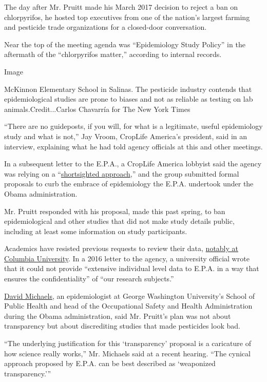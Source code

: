 The day after Mr. Pruitt made his March 2017 decision to reject a ban on
chlorpyrifos, he hosted top executives from one of the nation's largest
farming and pesticide trade organizations for a closed-door
conversation.

Near the top of the meeting agenda was ``Epidemiology Study Policy'' in
the aftermath of the ``chlorpyrifos matter,'' according to internal
records.

Image

McKinnon Elementary School in Salinas. The pesticide industry contends
that epidemiological studies are prone to biases and not as reliable as
testing on lab animals.Credit...Carlos Chavarría for The New York Times

``There are no guideposts, if you will, for what is a legitimate, useful
epidemiology study and what is not,'' Jay Vroom, CropLife America's
president, said in an interview, explaining what he had told agency
officials at this and other meetings.

In a subsequent letter to the E.P.A., a CropLife America lobbyist said
the agency was relying on a
``\href{https://www.documentcloud.org/documents/4641204-2017-7-24-Crop-Life-CLA-Comments-Chlorpyrifos.html}{shortsighted
approach},'' and the group submitted formal proposals to curb the
embrace of epidemiology the E.P.A. undertook under the Obama
administration.

Mr. Pruitt responded with his proposal, made this past spring, to ban
epidemiological and other studies that did not make study details
public, including at least some information on study participants.

Academics have resisted previous requests to review their data,
\href{https://www.epa.gov/ingredients-used-pesticide-products/chlorpyrifos-epas-seven-year-quest-columbias-raw-data}{notably
at Columbia University}. In a 2016 letter to the agency, a university
official wrote that it could not provide ``extensive individual level
data to E.P.A. in a way that ensures the confidentiality'' of ``our
research subjects.''

\href{https://publichealth.gwu.edu/departments/environmental-and-occupational-health/david-michaels-phd}{David
Michaels}, an epidemiologist at George Washington University's School of
Public Health and head of the Occupational Safety and Health
Administration during the Obama administration, said Mr. Pruitt's plan
was not about transparency but about discrediting studies that made
pesticides look bad.

``The underlying justification for this `transparency' proposal is a
caricature of how science really works,'' Mr. Michaels said at a recent
hearing. ``The cynical approach proposed by E.P.A. can be best described
as `weaponized transparency.'''

